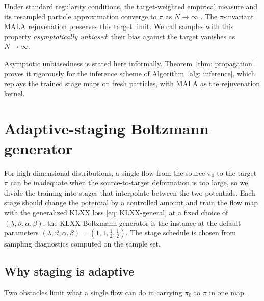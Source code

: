 \documentclass{article}
\begin{document}
Under standard regularity conditions, the target-weighted empirical measure and its resampled particle approximation converge to $\pi$ as $N\to\infty$ \citep{liu2001monte,doucet2001introduction}. The $\pi$-invariant MALA rejuvenation preserves this target limit. We call samples with this property \emph{asymptotically unbiased}: their bias against the target vanishes as $N\to\infty$.

\begin{remark}
Asymptotic unbiasedness is stated here informally. Theorem~\ref{thm: propagation} proves it rigorously for the inference scheme of Algorithm~\ref{alg: inference}, which replays the trained stage maps on fresh particles, with MALA as the rejuvenation kernel.
\end{remark}

\section{Adaptive-staging Boltzmann generator}
\label{sec: boltzmann}

For high-dimensional distributions, a single flow from the source $\pi_0$ to the target $\pi$ can be inadequate when the source-to-target deformation is too large, so we divide the training into stages that interpolate between the two potentials. Each stage should change the potential by a controlled amount and train the flow map with the generalized KLXX loss \eqref{eq: KLXX-general} at a fixed choice of $(\lambda,\vartheta,\alpha,\beta)$; the KLXX Boltzmann generator is the instance at the default parameters $(\lambda,\vartheta,\alpha,\beta)=(1,1,\frac12,\frac12)$. The stage schedule is chosen from sampling diagnostics computed on the sample set.

\subsection{Why staging is adaptive}

Two obstacles limit what a single flow can do in carrying $\pi_0$ to $\pi$ in one map.
\end{document}
